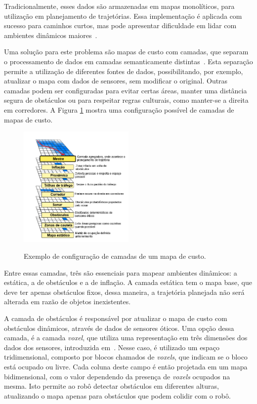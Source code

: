 \documentclass[repeatfields,xlists,xpacks,oneside,yearsonly]{ufrgscca}
\begin{document}
Tradicionalmente, esses dados são armazenadas em mapas monolíticos,
para utilização em planejamento de trajetórias. Essa implementação é
aplicada com sucesso para caminhos curtos, mas pode apresentar
dificuldade em lidar com ambientes dinâmicos
maiores~\cite{latombeRobotMotionPlanning}.

Uma solução para este problema são mapas de custo com camadas, que
separam o processamento de dados em camadas semanticamente
distintas~\cite{layered_costmaps}. Esta separação permite a
utilização de diferentes fontes de dados, possibilitando, por
exemplo, atualizar o mapa com dados de sensores, sem modificar o
original. Outras camadas podem ser configuradas para evitar certas
áreas, manter uma distância segura de obstáculos ou para respeitar
regras culturais, como manter-se a direita em corredores. A Figura
\ref{fig:mapa_camadas} mostra uma configuração possível de camadas de
mapas de custo.

\begin{figure}[h]
    {
        \centering
        \caption{Exemplo de configuração de camadas de um mapa de custo.}
        \label{fig:mapa_camadas}
        \includegraphics[width=0.5\textwidth]{mapa_camadas_trad.png}\\
    }
    {}
\end{figure}

Entre essas camadas, três são essenciais para mapear ambientes
dinâmicos: a estática, a de obstáculos e a de inflação. A camada
estática tem o mapa base, que deve ter apenas obstáculos fixos, dessa
maneira, a trajetória planejada não será alterada em razão de objetos
inexistentes.

A camada de obstáculos é responsável por atualizar o mapa de custo
com obstáculos dinâmicos, através de dados de sensores óticos. Uma
opção dessa camada, é a camada \textit{voxel}, que utiliza uma
representação em três dimensões dos dados dos sensores, introduzida
em~\textcite{office_marathon}. Nesse caso, é utilizado um espaço
tridimensional, composto por blocos chamados de \textit{voxels}, que
indicam se o bloco está ocupado ou livre. Cada coluna deste campo é
então projetada em um mapa bidimensional, com o valor dependendo da
presença de \textit{voxels} ocupados na mesma. Isto permite ao robô
detectar obstáculos em diferentes alturas, atualizando o mapa apenas
para obstáculos que podem colidir com o robô.
\end{document}
